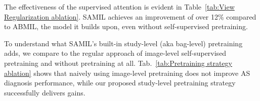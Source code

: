 The effectiveness of the supervised attention is evident in Table~\ref{tab:View Regularization ablation}. SAMIL achieves an improvement of over 12\% compared to ABMIL, the model it builds upon, even without self-supervised pretraining.

To understand what SAMIL's built-in study-level (aka bag-level) pretraining adds, we compare to the regular approach of image-level self-supervised pretraining and without pretraining at all. Tab.~\ref{tab:Pretraining strategy ablation} shows that naively using image-level pretraining does not improve AS diagnosis performance, while our proposed study-level pretraining strategy successfully delivers gains.


    

    
    











